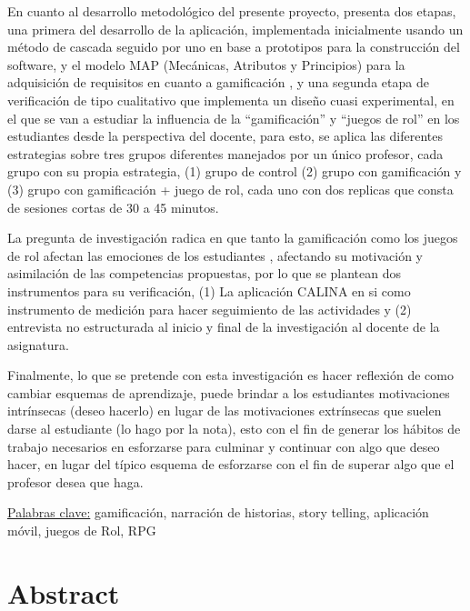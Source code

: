 \begin{singlespace}
En cuanto al desarrollo metodológico del presente proyecto, presenta dos etapas, una primera del desarrollo de 
la aplicación, implementada inicialmente usando un método de cascada seguido por uno en base a prototipos para 
la construcción del software, y el modelo MAP (Mecánicas, Atributos y Principios) para la adquisición de 
requisitos en cuanto a gamificación \cite{CECHELLA2018}, y una segunda etapa de verificación de tipo 
cualitativo que implementa un diseño cuasi experimental, en el que se van a estudiar la influencia de la 
``gamificación'' y ``juegos de rol'' en los estudiantes desde la perspectiva del docente, para esto, se aplica 
las diferentes estrategias sobre tres grupos diferentes manejados por un único profesor, cada grupo con su 
propia estrategia, (1) grupo de control (2) grupo con gamificación y (3) grupo con gamificación + juego de rol, 
cada uno con dos replicas que consta de sesiones cortas de 30 a 45 minutos. 

La pregunta de investigación radica en que tanto la gamificación como los juegos de rol afectan las emociones 
de los estudiantes \cite{MULLINS2020304}, afectando su motivación y asimilación de las competencias 
propuestas, por lo que se plantean dos instrumentos para su verificación, (1) La aplicación CALINA en si como 
instrumento de medición para hacer seguimiento de las actividades y (2) entrevista no estructurada
al inicio y final de la investigación al docente de la asignatura. 

Finalmente, lo que se pretende con esta investigación es hacer reflexión de como cambiar esquemas de 
aprendizaje, puede brindar a los estudiantes motivaciones intrínsecas (deseo hacerlo) en lugar de las 
motivaciones extrínsecas que suelen darse al estudiante (lo hago por la nota), esto con el fin de generar los 
hábitos de trabajo necesarios en esforzarse para culminar y continuar con algo que deseo hacer, en lugar del 
típico esquema de esforzarse con el fin de superar algo que el profesor desea que haga.
\end{singlespace}

\uline{Palabras clave:} gamificación, narración de historias, story telling, aplicación móvil, juegos de Rol, RPG

\section*{Abstract}

